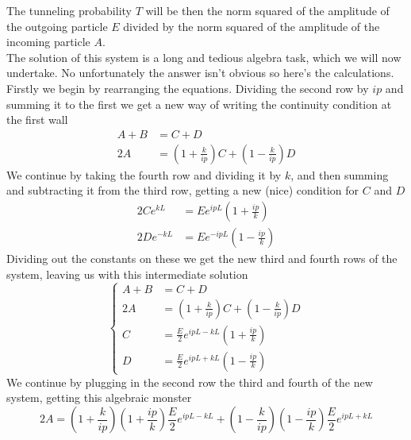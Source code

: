 \documentclass[../qm.tex]{subfiles}
\begin{document}
The tunneling probability $T$ will be then the norm squared of the amplitude of the outgoing particle $E$ divided by the norm squared of the amplitude of the incoming particle $A$.\\
The solution of this system is a long and tedious algebra task, which we will now undertake. No unfortunately the answer isn't obvious so here's the calculations.\\
Firstly we begin by rearranging the equations. Dividing the second row by $ip$ and summing it to the first we get a new way of writing the continuity condition at the first wall
\begin{equation*}
	\begin{aligned}
		A+B&=C+D\\
		2A&=\left( 1+\frac{k}{ip} \right)C+\left( 1-\frac{k}{ip} \right)D
	\end{aligned}
\end{equation*}
We continue by taking the fourth row and dividing it by $k$, and then summing and subtracting it from the third row, getting a new (nice) condition for $C$ and $D$
\begin{equation*}
	\begin{aligned}
		2Ce^{kL}&=Ee^{ipL}\left( 1+\frac{ip}{k} \right)\\
		2De^{-kL}&=Ee^{-ipL}\left( 1-\frac{ip}{k} \right)
	\end{aligned}
\end{equation*}
Dividing out the constants on these we get the new third and fourth rows of the system, leaving us with this intermediate solution
\begin{equation}
	\left\{ \begin{aligned}
		A+B&=C+D\\
		2A&=\left( 1+\frac{k}{ip} \right)C+\left( 1-\frac{k}{ip} \right)D\\
		C&=\frac{E}{2}e^{ipL-kL}\left( 1+\frac{ip}{k} \right)\\
		D&=\frac{E}{2}e^{ipL+kL}\left( 1-\frac{ip}{k} \right)
	\end{aligned}\right.
	\label{eq:intermsystemtunnel}
\end{equation}
We continue by plugging in the second row the third and fourth of the new system, getting this algebraic monster
\begin{equation*}
	2A=\left( 1+\frac{k}{ip} \right)\left( 1+\frac{ip}{k} \right)\frac{E}{2}e^{ipL-kL}+\left( 1-\frac{k}{ip} \right)\left( 1-\frac{ip}{k} \right)\frac{E}{2}e^{ipL+kL}
\end{equation*}
\end{document}
